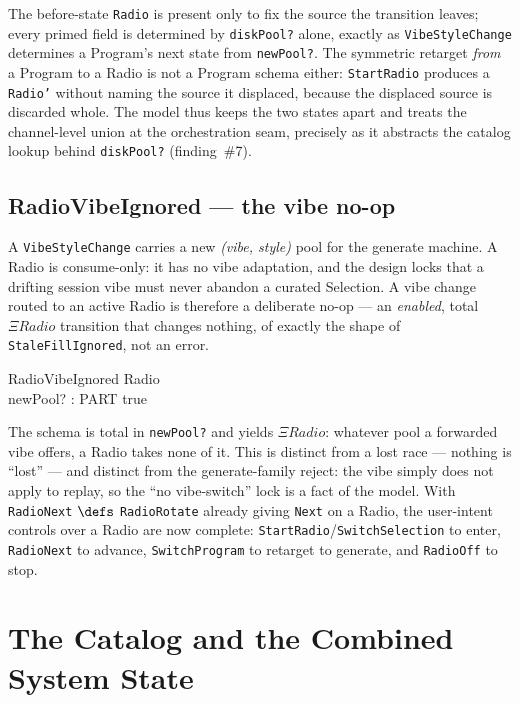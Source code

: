 \documentclass[a4paper,10pt,fleqn]{article}
\begin{document}
The before-state \texttt{Radio} is present only to fix the source the transition
leaves; every primed field is determined by \texttt{diskPool?} alone, exactly as
\texttt{VibeStyleChange} determines a Program's next state from \texttt{newPool?}.
The symmetric retarget \emph{from} a Program to a Radio is not a Program schema
either: \texttt{StartRadio} produces a \texttt{Radio'} without naming the source
it displaced, because the displaced source is discarded whole. The model thus
keeps the two states apart and treats the channel-level union at the
orchestration seam, precisely as it abstracts the catalog lookup behind
\texttt{diskPool?} (finding~\#7).

\subsection{RadioVibeIgnored --- the vibe no-op}

A \texttt{VibeStyleChange} carries a new \emph{(vibe, style)} pool for the
generate machine. A Radio is consume-only: it has no vibe adaptation, and the
design locks that a drifting session vibe must never abandon a curated Selection.
A vibe change routed to an active Radio is therefore a deliberate no-op --- an
\emph{enabled}, total $\Xi Radio$ transition that changes nothing, of exactly
the shape of \texttt{StaleFillIgnored}, not an error.

\begin{schema}{RadioVibeIgnored}
  \Xi Radio \\
  newPool? : \power PART
  \where
  true
\end{schema}

The schema is total in \texttt{newPool?} and yields $\Xi Radio$: whatever pool a
forwarded vibe offers, a Radio takes none of it. This is distinct from a lost
race --- nothing is ``lost'' --- and distinct from the generate-family reject: the
vibe simply does not apply to replay, so the ``no vibe-switch'' lock is a fact of
the model. With \texttt{RadioNext} $\defs$ \texttt{RadioRotate} already giving
\texttt{Next} on a Radio, the user-intent controls over a Radio are now complete:
\texttt{StartRadio}/\texttt{SwitchSelection} to enter, \texttt{RadioNext} to
advance, \texttt{SwitchProgram} to retarget to generate, and \texttt{RadioOff}
to stop.

\section{The Catalog and the Combined System State}
\label{sec:catalog}
\end{document}
